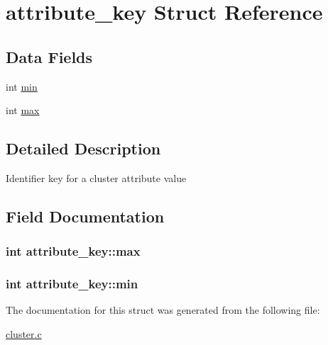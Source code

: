 \hypertarget{structattribute__key}{
\section{attribute\_\-key Struct Reference}
\label{structattribute__key}
}
\subsection*{Data Fields}
\begin{DoxyCompactItemize}
\item 
int \hyperlink{structattribute__key_a4fdb3d7aabeac6b1052b59e05e3d8842}{min}
\item 
int \hyperlink{structattribute__key_a82b7e5ac49820b816871a4ddf30c462d}{max}
\end{DoxyCompactItemize}


\subsection{Detailed Description}
Identifier key for a cluster attribute value 

\subsection{Field Documentation}
\hypertarget{structattribute__key_a82b7e5ac49820b816871a4ddf30c462d}{
\subsubsection[{max}]{\setlength{\rightskip}{0pt plus 5cm}int {\bf attribute\_\-key::max}}}
\label{structattribute__key_a82b7e5ac49820b816871a4ddf30c462d}
\hypertarget{structattribute__key_a4fdb3d7aabeac6b1052b59e05e3d8842}{
\subsubsection[{min}]{\setlength{\rightskip}{0pt plus 5cm}int {\bf attribute\_\-key::min}}}
\label{structattribute__key_a4fdb3d7aabeac6b1052b59e05e3d8842}


The documentation for this struct was generated from the following file:\begin{DoxyCompactItemize}
\item 
\hyperlink{cluster_8c}{cluster.c}\end{DoxyCompactItemize}
